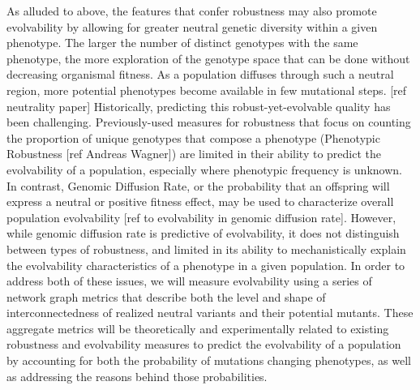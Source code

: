 As alluded to above, the features that confer robustness may also promote evolvability by allowing for greater neutral genetic diversity within a given phenotype. The larger the number of distinct genotypes with the same phenotype, the more exploration of the genotype space that can be done without decreasing organismal fitness. As a population diffuses through such a neutral region, more potential phenotypes become available in few mutational steps. [ref neutrality paper]
Historically, predicting this robust-yet-evolvable quality has been challenging. Previously-used measures for robustness that focus on counting the proportion of unique genotypes that compose a phenotype (Phenotypic Robustness [ref Andreas Wagner]) are limited in their ability to predict the evolvability of a population, especially where phenotypic frequency is unknown. 
In contrast, Genomic Diffusion Rate, or the probability that an offspring will express a neutral or positive fitness effect, may be used to characterize overall population evolvability [ref to evolvability in genomic diffusion rate]. However, while genomic diffusion rate is predictive of evolvability, it does not distinguish between types of robustness, and limited in its ability to mechanistically explain the evolvability characteristics of a phenotype in a given population. 
In order to address both of these issues, we will measure evolvability using a series of network graph metrics that describe both the level and shape of interconnectedness of realized neutral variants and their potential mutants. These aggregate metrics will be theoretically and experimentally related to existing robustness and evolvability measures to predict the evolvability of a population by accounting for both the probability of mutations changing phenotypes, as well as addressing the reasons behind those probabilities.


